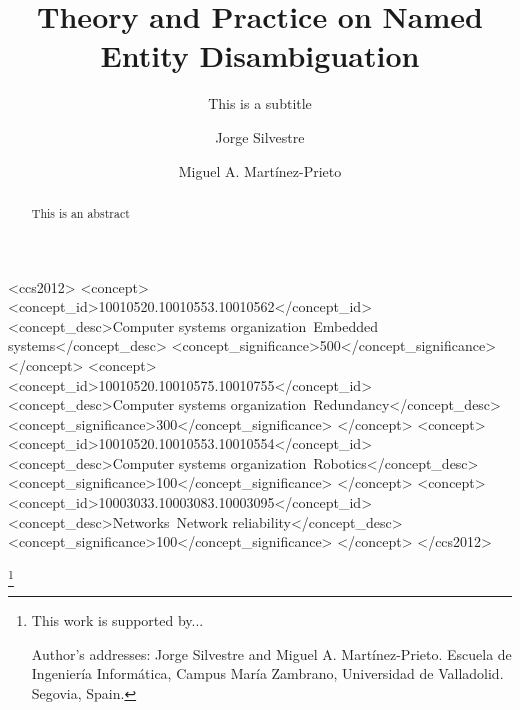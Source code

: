 \documentclass[	
				manuscript,
				acmlarge,
				review,
				screen,
				9pt
				]{acmart}
\theoremstyle{definition}
\begin{document}
	
\title{Theory and Practice on Named Entity Disambiguation} 
   \subtitle{This is a subtitle}
\author{Jorge Silvestre}
\author{Miguel A. Mart\'inez-Prieto}

\begin{abstract}
This is an abstract 
\end{abstract}


\begin{CCSXML}
<ccs2012>
 <concept>
  <concept_id>10010520.10010553.10010562</concept_id>
  <concept_desc>Computer systems organization~Embedded systems</concept_desc>
  <concept_significance>500</concept_significance>
 </concept>
 <concept>
  <concept_id>10010520.10010575.10010755</concept_id>
  <concept_desc>Computer systems organization~Redundancy</concept_desc>
  <concept_significance>300</concept_significance>
 </concept>
 <concept>
  <concept_id>10010520.10010553.10010554</concept_id>
  <concept_desc>Computer systems organization~Robotics</concept_desc>
  <concept_significance>100</concept_significance>
 </concept>
 <concept>
  <concept_id>10003033.10003083.10003095</concept_id>
  <concept_desc>Networks~Network reliability</concept_desc>
  <concept_significance>100</concept_significance>
 </concept>
</ccs2012>  
\end{CCSXML}


%
%



\thanks{This work is supported by...

  Author's addresses: Jorge Silvestre {and} Miguel A. Mart\'inez-Prieto.
  Escuela de Ingenier\'ia Inform\'atica, Campus Mar\'ia Zambrano, Universidad de Valladolid.
  Segovia, Spain.}

\end{document}
